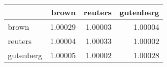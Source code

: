 \begin{tabular}{lrrr}
\hline
           &   brown &   reuters &   gutenberg \\
\hline
 brown     & 1.00029 &   1.00003 &     1.00004 \\
 reuters   & 1.00004 &   1.00033 &     1.00002 \\
 gutenberg & 1.00005 &   1.00002 &     1.00028 \\
\hline
\end{tabular}